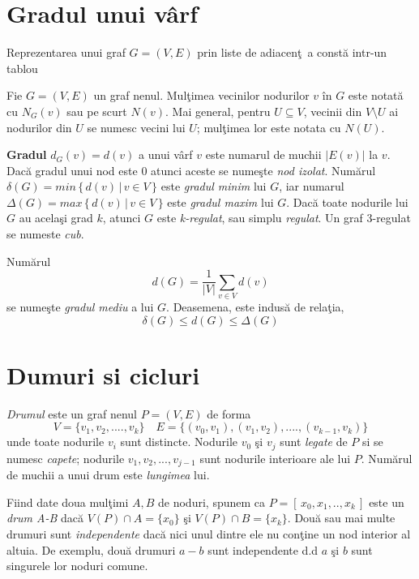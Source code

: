 \documentclass[11pt,a4paper]{report}
\begin{document}
    \section{Gradul unui v\^ arf}
    
   Reprezentarea unui graf $G=(V,E)$ prin liste de adiacen\c t\ a const\u a intr-un tablou 
    
    Fie $G=(V,E)$ un graf nenul. Mul\c timea vecinilor nodurilor  $v$ \^ in $G$ este notat\u a cu $N_G(v)$ sau pe scurt $N(v)$. Mai general, pentru $U\subseteq V$, vecinii din $V\setminus U$ ai nodurilor din $U$ se numesc vecini lui $U$; mul\c timea lor este notata cu $N(U)$.
    
    \textbf{Gradul} $d_G(v)=d(v)$ a unui v\^ arf $v$  este numarul de muchii $|E(v)|$ la $v$. Dac\u a gradul unui nod este $0$ atunci aceste se nume\c ste \textit{nod izolat}. Num\u arul $\delta(G)=min\, \{\,d(v)\, |\, v\in V\, \}$ este \textit{gradul minim}  lui $G$, iar numarul $\Delta(G)=max\, \{\, d(v)\, |\, v\in V\,\}$ este \textit{gradul maxim}  lui $G$. Dac\u a toate nodurile lui $G$ au acela\c si grad $k$, atunci $G$ este \textit{k-regulat}, sau simplu \textit{regulat}. Un graf 3-regulat se numeste \textit{cub}.
    
    Num\u arul
        \begin{equation*}
    d(G)=\frac{1}{|V|} \sum\limits_{v\in V} d(v)
    \end{equation*}
    se nume\c ste \textit{gradul mediu }a lui $G$. Deasemena, este indus\u a de rela\c tia,
    \begin{equation*}
    \delta(G)\le d(G)\le \Delta(G)
    \end{equation*}
    
    
    
    \section{Dumuri si cicluri}
    \textit{Drumul} este un graf nenul $P=(V,E)$ de forma 
    \begin{equation*}
    V=\{v_1,v_2,....,v_k\}\quad E=\{(v_0,v_1),(v_1,v_2),....,(v_{k-1},v_k)\}
    \end{equation*}
    unde toate nodurile $v_i$ sunt distincte. Nodurile $v_0$ \c si $v_j$ sunt \textit{legate} de $P$ si se numesc \textit{capete}; nodurile $v_1,v_2,...,v_{j-1}$ sunt nodurile interioare ale lui $P$. Num\u arul de muchii a unui drum este \textit{lungimea } lui.
    
    Fiind date doua mul\c timi $A,B$ de noduri, spunem ca $P=[\,x_0,x_1,..,x_k\,]$ este un \textit{drum A-B} dac\u a $V(P)\cap A=\{x_0\}$ \c si $V(P)\cap B=\{x_k\}$. Dou\u a sau mai multe drumuri sunt \textit{independente} dac\u a nici unul dintre ele nu con\c tine un nod interior al altuia. De exemplu, dou\u a drumuri $a-b$ sunt independente d.d $a$ \c si $b$ sunt singurele lor noduri comune.
    
\end{document}
